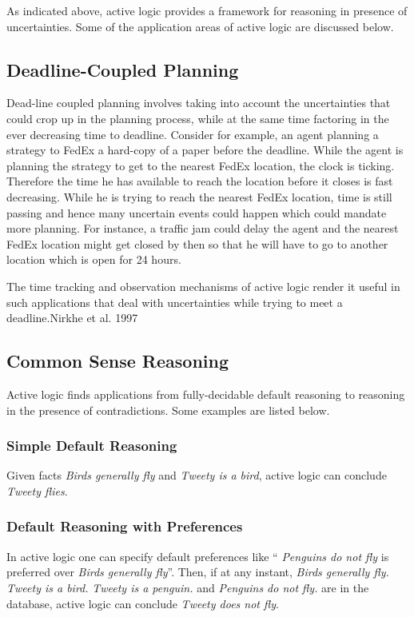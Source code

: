 
%

As indicated above, active logic provides a framework for reasoning in
presence of uncertainties.  Some of the
application areas of active logic are discussed below.

\subsection{Deadline-Coupled Planning}
Dead-line coupled planning involves taking into
account the uncertainties that could crop up in the planning process,
while at the same time factoring in the ever decreasing time to deadline.
        Consider for example, an agent planning a strategy to FedEx a hard-copy of
	a paper before the deadline. While the agent is
	planning the strategy to get to the nearest FedEx location, the clock is ticking. 
	Therefore the time he has available to reach the location before it closes is fast 
	decreasing. While he is trying to reach the nearest
	FedEx location, time is still passing and hence many uncertain
	events could happen which could mandate more 
	planning. For instance, a traffic jam could delay the agent and
	the nearest FedEx location might get closed by then so that he
	will have to go to another location which is open for 24
	hours. 

 The time tracking and observation mechanisms of active logic render it useful in such
applications that deal with uncertainties while trying to meet a deadline.{Nirkhe et al. 1997}


\subsection{Common Sense Reasoning}
Active logic finds applications from fully-decidable default reasoning
to reasoning in the presence of contradictions. Some examples are
listed below.

\subsubsection{Simple Default Reasoning}
	Given facts {\em Birds generally fly} and {\em Tweety is a bird},
	active logic can conclude {\em Tweety flies}.
	
\subsubsection{Default Reasoning with Preferences}
	In active logic one can specify default preferences like  ``{\em
	Penguins do not fly} is preferred over {\em Birds generally
	fly}''. Then, if at any instant, {\em Birds generally fly.}
	{\em Tweety is a bird.} {\em Tweety is a
	penguin.} and {\em Penguins do not fly.} are in the database,
	active logic can conclude {\em Tweety does not fly}.

